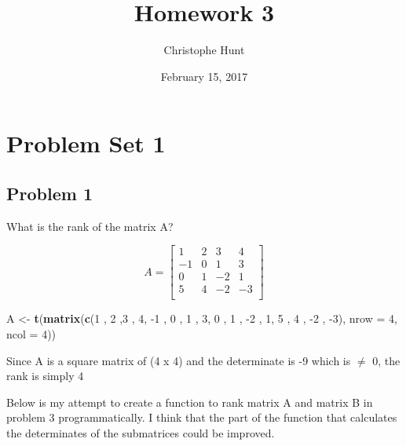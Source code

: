 \documentclass[]{article}
\title{Homework 3}
\author{Christophe Hunt}
\date{February 15, 2017}
\newenvironment{Shaded}{\begin{snugshade}}{\end{snugshade}}
\newcommand{\KeywordTok}[1]{\textcolor[rgb]{0.13,0.29,0.53}{\textbf{{#1}}}}
\newcommand{\DataTypeTok}[1]{\textcolor[rgb]{0.13,0.29,0.53}{{#1}}}
\newcommand{\DecValTok}[1]{\textcolor[rgb]{0.00,0.00,0.81}{{#1}}}
\newcommand{\StringTok}[1]{\textcolor[rgb]{0.31,0.60,0.02}{{#1}}}
\newcommand{\NormalTok}[1]{{#1}}
\begin{document}
\maketitle

{
\setcounter{tocdepth}{2}
\tableofcontents
}
\section{Problem Set 1}\label{problem-set-1}

\subsection{Problem 1}\label{problem-1}

What is the rank of the matrix A?

\[
A = \begin{bmatrix}
    1 & 2 & 3 &4  \\
   -1 & 0 & 1 & 3  \\
   0 & 1 & -2 & 1   \\
   5 & 4 & -2 & -3   \\
\end{bmatrix}
\]

\begin{Shaded}
\begin{Highlighting}[]
\NormalTok{A <-}\StringTok{ }\KeywordTok{t}\NormalTok{(}\KeywordTok{matrix}\NormalTok{(}\KeywordTok{c}\NormalTok{(}\DecValTok{1} \NormalTok{, }\DecValTok{2} \NormalTok{,}\DecValTok{3} \NormalTok{, }\DecValTok{4}\NormalTok{, }
              \NormalTok{-}\DecValTok{1} \NormalTok{, }\DecValTok{0} \NormalTok{, }\DecValTok{1} \NormalTok{, }\DecValTok{3}\NormalTok{, }
              \DecValTok{0} \NormalTok{, }\DecValTok{1} \NormalTok{, -}\DecValTok{2} \NormalTok{, }\DecValTok{1}\NormalTok{, }
              \DecValTok{5} \NormalTok{, }\DecValTok{4} \NormalTok{, -}\DecValTok{2} \NormalTok{, -}\DecValTok{3}\NormalTok{), }\DataTypeTok{nrow =} \DecValTok{4}\NormalTok{, }\DataTypeTok{ncol =} \DecValTok{4}\NormalTok{))}
\end{Highlighting}
\end{Shaded}

Since A is a square matrix of (4 x 4) and the determinate is -9 which is
\(\neq\) 0, the rank is simply 4

Below is my attempt to create a function to rank matrix A and matrix B
in problem 3 programmatically. I think that the part of the function
that calculates the determinates of the submatrices could be improved.
\end{document}
